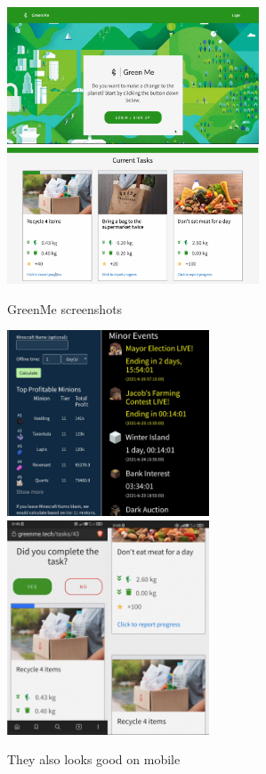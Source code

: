 \begin{figure}[H]
\centering
\includegraphics[width=7.5cm]{images/chn0-code-greenme-0.png}
\includegraphics[width=7.5cm]{images/chn0-code-greenme-3.png}
\caption{GreenMe screenshots}
\end{figure}

\begin{figure}[H]
\centering
\includegraphics[width=6cm]{images/chn0-code-hyminions-4.png}
\includegraphics[width=6cm]{images/chn0-code-greenme-6.png}
\caption{They also looks good on mobile}
\end{figure}

